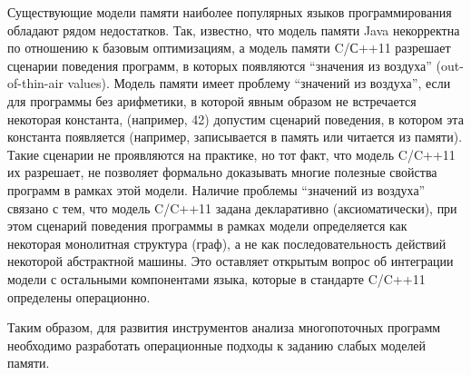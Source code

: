 Существующие модели памяти наиболее популярных языков программирования обладают рядом недостатков.
Так, известно, что модель памяти Java некорректна по отношению
к базовым оптимизациям, а модель памяти C/С++11 разрешает
сценарии поведения программ, в которых появляются ``значения из воздуха'' (out-of-thin-air values).
Модель памяти имеет проблему ``значений из воздуха'', если для программы без арифметики,
в которой явным образом не встречается некоторая константа, (например, 42) допустим сценарий поведения,
в котором эта константа появляется (например, записывается в память или читается из памяти).
Такие сценарии не проявляются на практике, но тот факт,
что модель C/C++11 их разрешает, не позволяет формально доказывать многие полезные свойства программ в рамках этой модели.
Наличие проблемы ``значений из воздуха'' связано с тем, что модель C/C++11 задана декларативно (аксиоматически), при этом сценарий поведения программы
в рамках модели определяется как некоторая монолитная структура (граф), а не как последовательность действий некоторой
абстрактной машины.
Это оставляет открытым вопрос об интеграции модели с остальными компонентами языка, которые в стандарте C/C++11 определены
операционно.

Таким образом, для развития инструментов анализа многопоточных программ необходимо
разработать операционные подходы к заданию слабых моделей памяти.



